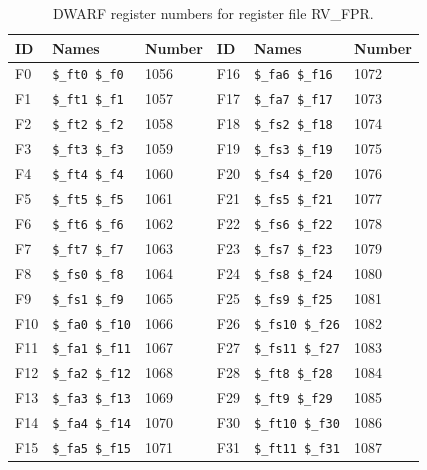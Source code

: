 \begin{table}
\begin{center}
{\small
\begin{tabular}{|l|l|l||l|l|l|} \hline
ID & Names & Number & ID & Names & Number \\ \hline
F0 & \verb|$_ft0 $_f0| & 1056 &
F16 & \verb|$_fa6 $_f16| & 1072 \\
F1 & \verb|$_ft1 $_f1| & 1057 &
F17 & \verb|$_fa7 $_f17| & 1073 \\
F2 & \verb|$_ft2 $_f2| & 1058 &
F18 & \verb|$_fs2 $_f18| & 1074 \\
F3 & \verb|$_ft3 $_f3| & 1059 &
F19 & \verb|$_fs3 $_f19| & 1075 \\
F4 & \verb|$_ft4 $_f4| & 1060 &
F20 & \verb|$_fs4 $_f20| & 1076 \\
F5 & \verb|$_ft5 $_f5| & 1061 &
F21 & \verb|$_fs5 $_f21| & 1077 \\
F6 & \verb|$_ft6 $_f6| & 1062 &
F22 & \verb|$_fs6 $_f22| & 1078 \\
F7 & \verb|$_ft7 $_f7| & 1063 &
F23 & \verb|$_fs7 $_f23| & 1079 \\
F8 & \verb|$_fs0 $_f8| & 1064 &
F24 & \verb|$_fs8 $_f24| & 1080 \\
F9 & \verb|$_fs1 $_f9| & 1065 &
F25 & \verb|$_fs9 $_f25| & 1081 \\
F10 & \verb|$_fa0 $_f10| & 1066 &
F26 & \verb|$_fs10 $_f26| & 1082 \\
F11 & \verb|$_fa1 $_f11| & 1067 &
F27 & \verb|$_fs11 $_f27| & 1083 \\
F12 & \verb|$_fa2 $_f12| & 1068 &
F28 & \verb|$_ft8 $_f28| & 1084 \\
F13 & \verb|$_fa3 $_f13| & 1069 &
F29 & \verb|$_ft9 $_f29| & 1085 \\
F14 & \verb|$_fa4 $_f14| & 1070 &
F30 & \verb|$_ft10 $_f30| & 1086 \\
F15 & \verb|$_fa5 $_f15| & 1071 &
F31 & \verb|$_ft11 $_f31| & 1087 \\
\hline \end{tabular}
}
\end{center}
\caption{DWARF register numbers for register file RV_FPR.}
\label{table:DwarfId-RV_FPR}
\end{table}

